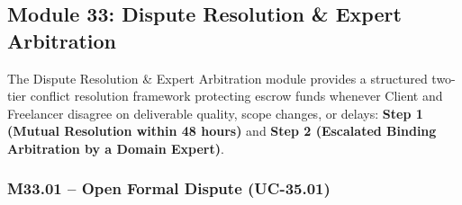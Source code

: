 
\newpage
\subsection{Module 33: Dispute Resolution \& Expert Arbitration}

The Dispute Resolution \& Expert Arbitration module provides a structured two-tier conflict resolution framework protecting escrow funds whenever Client and Freelancer disagree on deliverable quality, scope changes, or delays: \textbf{Step 1 (Mutual Resolution within 48 hours)} and \textbf{Step 2 (Escalated Binding Arbitration by a Domain Expert)}.

\subsubsection{M33.01 -- Open Formal Dispute (UC-35.01)}

